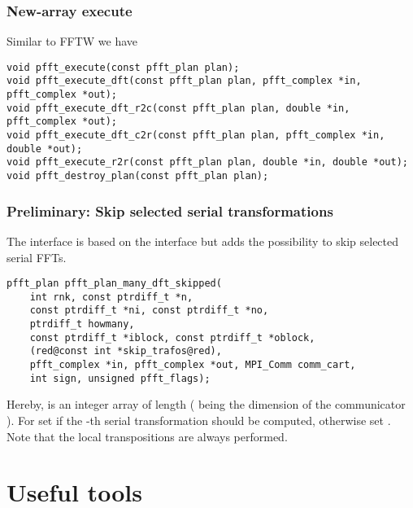 \subsubsection{New-array execute}
Similar to FFTW we have
\begin{lstlisting}[escapechar=§]
void pfft_execute(const pfft_plan plan);
void pfft_execute_dft(const pfft_plan plan, pfft_complex *in, pfft_complex *out);
void pfft_execute_dft_r2c(const pfft_plan plan, double *in, pfft_complex *out);
void pfft_execute_dft_c2r(const pfft_plan plan, pfft_complex *in, double *out);
void pfft_execute_r2r(const pfft_plan plan, double *in, double *out);
void pfft_destroy_plan(const pfft_plan plan);
\end{lstlisting}



\subsubsection{Preliminary: Skip selected serial transformations}
The  interface is based on the  interface but adds the possibility to skip selected serial FFTs.
\begin{lstlisting}[escapechar=§]
pfft_plan pfft_plan_many_dft_skipped(
    int rnk, const ptrdiff_t *n,
    const ptrdiff_t *ni, const ptrdiff_t *no,
    ptrdiff_t howmany,
    const ptrdiff_t *iblock, const ptrdiff_t *oblock,
    (red@const int *skip_trafos@red),
    pfft_complex *in, pfft_complex *out, MPI_Comm comm_cart,
    int sign, unsigned pfft_flags);
\end{lstlisting}
Hereby,  is an integer array of length  ( being the dimension of the communicator ).
For  set  if the -th serial transformation should be computed, otherwise set .
Note that the local transpositions are always performed.

\section{Useful tools}
